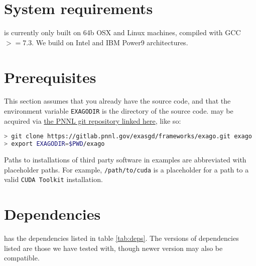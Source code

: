 \section{System requirements}

\exago is currently only built on 64b OSX and Linux machines, compiled with GCC $>= 7.3$.
We build \exago on Intel and IBM Power9 architectures.

\section{Prerequisites}

This section assumes that you already have the \exago source code, and that the environment variable \texttt{EXAGODIR} is the directory of the \exago source code.
\exago may be acquired via \href{https://gitlab.pnnl.gov/exasgd/frameworks/exago}{the PNNL git repository linked here}, like so:

\begin{lstlisting}[language=bash]
> git clone https://gitlab.pnnl.gov/exasgd/frameworks/exago.git exago
> export EXAGODIR=$PWD/exago
\end{lstlisting}

Paths to installations of third party software in examples are abbreviated with placeholder paths.
For example, \texttt{/path/to/cuda} is a placeholder for a path to a valid \texttt{CUDA Toolkit} installation.

\section{Dependencies}

\exago has the dependencies listed in table \ref{tab:deps}. The versions of dependencies listed are those we have tested with, though newer version may also be compatible.

